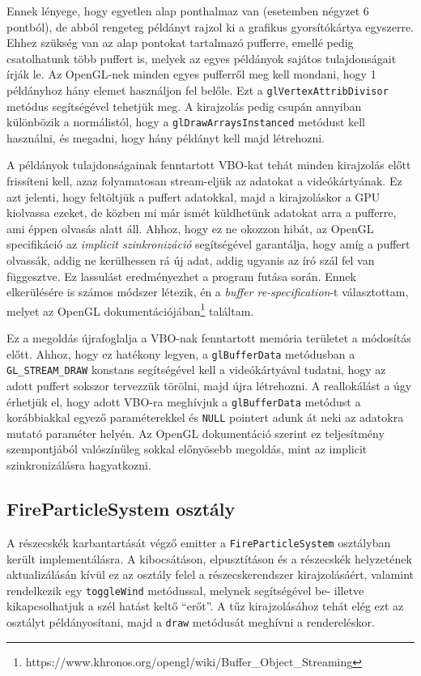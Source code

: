 Ennek lényege, hogy egyetlen alap ponthalmaz van (esetemben négyzet 6 pontból), de abból rengeteg példányt rajzol ki a grafikus gyorsítókártya egyszerre. Ehhez szükség van az alap pontokat tartalmazó pufferre, emellé pedig csatolhatunk több puffert is, melyek az egyes példányok sajátos tulajdonságait írják le. Az OpenGL-nek minden egyes pufferről meg kell mondani, hogy 1 példányhoz hány elemet használjon fel belőle. Ezt a \texttt{glVertexAttribDivisor} metódus segítségével tehetjük meg. A kirajzolás pedig csupán annyiban különbözik a normálistól, hogy a \texttt{glDrawArraysInstanced} metódust kell használni, és megadni, hogy hány példányt kell majd létrehozni.

A példányok tulajdonságainak fenntartott VBO-kat tehát minden kirajzolás előtt frissíteni kell, azaz folyamatosan stream-eljük az adatokat a videókártyának. Ez azt jelenti, hogy feltöltjük a puffert adatokkal, majd a kirajzoláskor a GPU kiolvassa ezeket, de közben mi már ismét küldhetünk adatokat arra a pufferre, ami éppen olvasás alatt áll. Ahhoz, hogy ez ne okozzon hibát, az OpenGL specifikáció az \textit{implicit szinkronizáció} segítségével garantálja, hogy amíg a puffert olvassák, addig ne kerülhessen rá új adat, addig ugyanis az író szál fel van függesztve. Ez lassulást eredményezhet a program futása során. Ennek elkerülésére is számos módszer létezik, én a \textit{buffer re-specification}-t választottam, melyet az OpenGL dokumentációjában\footnote{https://www.khronos.org/opengl/wiki/Buffer\_Object\_Streaming} találtam.

 Ez a megoldás újrafoglalja a VBO-nak fenntartott memória területet a módosítás előtt. Ahhoz, hogy ez hatékony legyen, a \texttt{glBufferData} metódusban a \texttt{GL\_STREAM\_DRAW} konstans segítségével kell a videókártyával tudatni, hogy az adott puffert sokszor tervezzük törölni, majd újra létrehozni. A reallokálást a úgy érhetjük el, hogy adott VBO-ra meghívjuk a \texttt{glBufferData} metódust a korábbiakkal egyező paraméterekkel és \texttt{NULL} pointert adunk át neki az adatokra mutató paraméter helyén. Az OpenGL dokumentáció szerint ez teljesítmény szempontjából valószínűleg sokkal előnyösebb megoldás, mint az implicit szinkronizálásra hagyatkozni.

\subsection{FireParticleSystem osztály}
A részecskék karbantartását végző emitter a \texttt{FireParticleSystem} osztályban került implementálásra. A kibocsátáson, elpusztításon és a részecskék helyzetének aktualizálásán kívül ez az osztály felel a részecskerendszer kirajzolásáért, valamint rendelkezik egy \texttt{toggleWind} metódussal, melynek segítségével be- illetve kikapcsolhatjuk a szél hatást keltő ``erőt''. A tűz kirajzolásához tehát elég ezt az osztályt példányosítani, majd a \texttt{draw} metódusát meghívni a rendereléskor.

